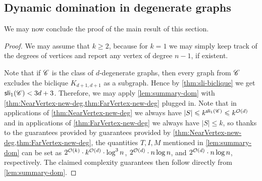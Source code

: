 \subsection{Dynamic domination in degenerate graphs}

We may now conclude the proof of the main result of this section.

\mainDomDeg*
\begin{proof}
	We may assume that $k\geq 2$, because for $k=1$ we may simply keep track of the degrees of vertices and report any vertex of degree $n-1$, if existent.
	
	Note that if $\mathscr C$ is the class of $d$-degenerate graphs, then every graph from $\mathscr C$ excludes the biclique $K_{d+1,d+1}$ as a subgraph. Hence by \cref{thm:sli-biclique} we get $\mathsf{sli}_1(\mathscr C)<3d+3$. Therefore, we may apply \cref{lem:summary-dom} with  \cref{thm:NearVertex-new-deg,thm:FarVertex-new-deg} plugged in. Note that in applications of \cref{thm:NearVertex-new-deg} we always have $|S|\leqslant k^{\mathsf{sli}_1(\mathscr C)}\leqslant k^{\mathcal{O}(d)}$ and in applications of \cref{thm:FarVertex-new-deg} we always have $|S|\leq k$, so thanks to the guarantees provided by guarantees provided by \cref{thm:NearVertex-new-deg,thm:FarVertex-new-deg}, the quantities $T,I,M$ mentioned in \cref{lem:summary-dom} can be set as $2^{\mathcal{O}(k)}\cdot k^{\mathcal{O}(d)}\cdot \log^3 n$, $2^{\mathcal{O}(d)}\cdot n\log n$, and $2^{\mathcal{O}(d)}\cdot n\log n$, respectively. The claimed complexity guarantees then follow directly from \cref{lem:summary-dom}.
\end{proof}


